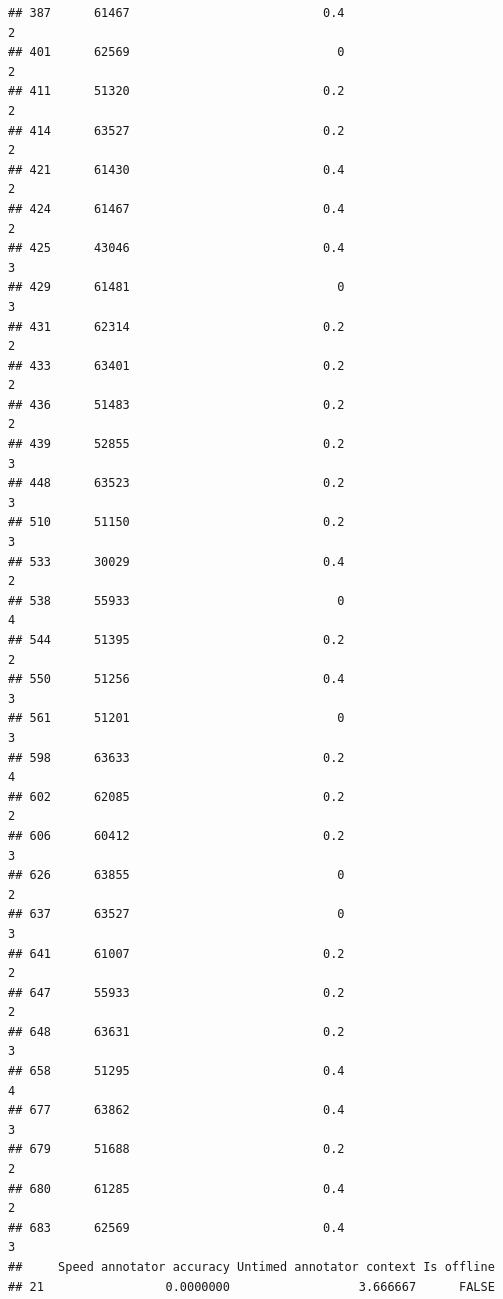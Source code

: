 \documentclass[
]{article}
\begin{document}
\begin{verbatim}
## 387      61467                           0.4                              2
## 401      62569                             0                              2
## 411      51320                           0.2                              2
## 414      63527                           0.2                              2
## 421      61430                           0.4                              2
## 424      61467                           0.4                              2
## 425      43046                           0.4                              3
## 429      61481                             0                              3
## 431      62314                           0.2                              2
## 433      63401                           0.2                              2
## 436      51483                           0.2                              2
## 439      52855                           0.2                              3
## 448      63523                           0.2                              3
## 510      51150                           0.2                              3
## 533      30029                           0.4                              2
## 538      55933                             0                              4
## 544      51395                           0.2                              2
## 550      51256                           0.4                              3
## 561      51201                             0                              3
## 598      63633                           0.2                              4
## 602      62085                           0.2                              2
## 606      60412                           0.2                              3
## 626      63855                             0                              2
## 637      63527                             0                              3
## 641      61007                           0.2                              2
## 647      55933                           0.2                              2
## 648      63631                           0.2                              3
## 658      51295                           0.4                              4
## 677      63862                           0.4                              3
## 679      51688                           0.2                              2
## 680      61285                           0.4                              2
## 683      62569                           0.4                              3
##     Speed annotator accuracy Untimed annotator context Is offline
## 21                 0.0000000                  3.666667      FALSE

\end{verbatim}
\end{document}
